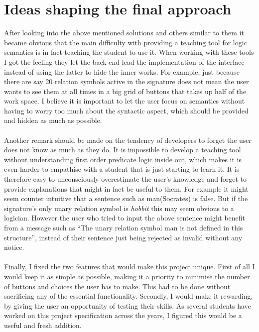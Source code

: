 \documentclass{report}
\begin{document}
\section{Ideas shaping the final approach}
After looking into the above mentioned solutions and others similar to them it 
became obvious that the main difficulty with providing a teaching tool for logic 
semantics is in fact teaching the student to use it. When working with these 
tools I got the feeling they let the back end lead the implementation of the 
interface instead of using the latter to hide the inner works. For example, just 
because there are say 20 relation symbols active in the signature does not mean 
the user wants to see them at all times in a big grid of buttons that takes up 
half of the work space. I believe it is important to let the user focus on 
semantics without having to worry too much about the syntactic aspect, which 
should be provided and hidden as much as possible. 
\\ \\
Another remark should be made on the tendency of developers to forget the user 
does not know as much as they do. It is impossible to develop a teaching tool 
without understanding first order predicate logic inside out, which makes it is 
even harder to empathise with a student that is just starting to learn it. It is 
therefore easy to unconsciously overestimate the user's knowledge and forget to 
provide explanations that might in fact be useful to them. For example it might 
seem counter intuitive that a sentence such as man(Socrates) is false. But if 
the signature's only unary relation symbol is \emph{hobbit} this may seem 
obvious to a logician. However the user who tried to input the above sentence 
might benefit from a message such as ``The unary relation symbol man is not 
defined in this structure'', instead of their sentence just being rejected as 
invalid without any notice.
\\ \\
Finally, I fixed the two features that would make this project unique. First of 
all I would keep it as simple as possible, making it a priority to minimise the 
number of buttons and choices the user has to make. This had to be done without 
sacrificing any of the essential functionality. Secondly, I would make it 
rewarding, by giving the user an opportunity of testing their skills. As several 
students have worked on this project specification across the years, I figured 
this would be a useful and fresh addition.
\end{document}
